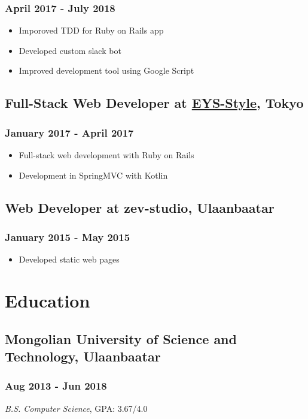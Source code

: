 \documentclass[letterpaper]{article}
\begin{document}
\subsubsection{April 2017 - July 2018}
\label{sec:org7be2a18}
\begin{itemize}
\item Imporoved TDD for Ruby on Rails app
\item Developed custom slack bot
\item Improved development tool using Google Script
\end{itemize}
\subsection{Full-Stack Web Developer at \href{http:www.eys-style.com}{EYS-Style}, Tokyo}
\label{sec:org307047b}
\subsubsection{January 2017 - April 2017}
\label{sec:org9cdfebd}
\begin{itemize}
\item Full-stack web development with Ruby on Rails
\item Development in SpringMVC with Kotlin
\end{itemize}
\subsection{Web Developer at zev-studio, Ulaanbaatar}
\label{sec:orgab100c2}
\subsubsection{January 2015 - May 2015}
\label{sec:org3cd7137}
\begin{itemize}
\item Developed static web pages
\end{itemize}
\section{Education}
\label{sec:org7d22b5e}
\subsection{Mongolian University of Science and Technology, Ulaanbaatar}
\label{sec:org2fe2b60}
\subsubsection{Aug 2013 - Jun 2018}
\label{sec:org0e000d0}
\emph{B.S. Computer Science}, GPA: 3.67/4.0
\end{document}
